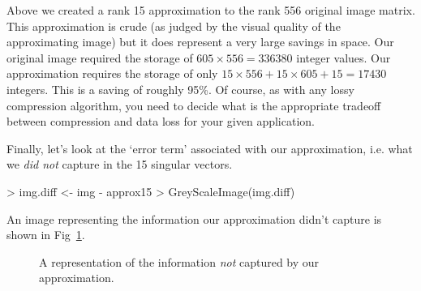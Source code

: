 Above we created a rank 15 approximation to the rank 556 original image matrix. This approximation is crude (as judged by the visual quality of the approximating image) but it does represent a very large savings in space. Our original image required the storage of $605 \times 556 = 336380$ integer values. Our approximation requires the storage of only $15 \times 556 + 15 \times 605 + 15 = 17430$ integers. This is a saving of roughly 95\%. Of course, as with any lossy compression algorithm, you need to decide what is the appropriate tradeoff between compression and data loss for your given application.

Finally, let's look at the `error term' associated with our approximation, i.e. what we \emph{did not} capture in the 15 singular vectors.
%
\begin{R}
> img.diff <- img - approx15
> GreyScaleImage(img.diff)
\end{R}
%
An image representing the information our approximation didn't capture is shown in Fig~\ref{fig:chesterdiff}.
%
\begin{figure}[ht!]
  \caption{A representation of the information \emph{not} captured by our approximation.\label{fig:chesterdiff}}
\end{figure}
  

